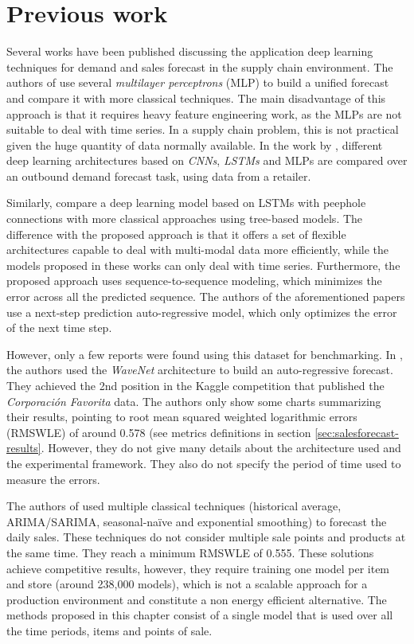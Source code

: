 \section{Previous work}	\label{sec:salesforecast_prevwork}
Several works have been published discussing the application deep learning techniques for demand and sales forecast in the supply chain environment. The authors of \autocite{Kilimci2019} use several \textit{multilayer perceptrons} (MLP) to build a unified forecast and compare it with more classical techniques. The main disadvantage of this approach is that it requires heavy feature engineering work, as the MLPs are not suitable to deal with time series. In a supply chain problem, this is not practical given the huge quantity of data normally available. In the work by \autocite{Talupula2018}, different deep learning architectures based on \textit{CNNs}, \textit{LSTMs} and MLPs are compared over an outbound demand forecast task, using data from a retailer. 

Similarly, \autocite{Helmini2019} compare a deep learning model based on LSTMs with peephole connections with more classical approaches using tree-based models.  The difference with the proposed approach is that it offers a set of flexible architectures capable to deal with multi-modal data more efficiently, while the models proposed in these works can only deal with time series. Furthermore, the proposed approach uses sequence-to-sequence modeling, which minimizes the error across all the predicted sequence. The authors of the aforementioned papers use a next-step prediction auto-regressive model, which only optimizes the error of the next time step.

However, only a few reports were found using this dataset for benchmarking. In \autocite{kechyn2018}, the authors used the \textit{WaveNet} \autocite{vanderoord2016} architecture to build an auto-regressive forecast. They achieved the 2nd position in the Kaggle competition that published the \textit{Corporación Favorita} data. The authors only show some charts summarizing their results, pointing to root mean squared weighted logarithmic errors (RMSWLE) of around 0.578 (see metrics definitions in section \ref{sec:salesforecast-results}. However, they do not give many details about the architecture used and the experimental framework. They also do not specify the period of time used to measure the errors. 

The authors of \autocite{Steves2018} used multiple classical techniques (historical average, ARIMA/SARIMA, seasonal-naïve and exponential smoothing) to forecast the daily sales. These techniques do not consider multiple sale points and products at the same time. They reach a minimum RMSWLE of 0.555. These solutions achieve competitive results, however, they require training one model per item and store (around 238,000 models), which is not a scalable approach for a production environment and constitute a non energy efficient alternative. The methods proposed in this chapter consist of a single model that is used over all the time periods, items and points of sale.


